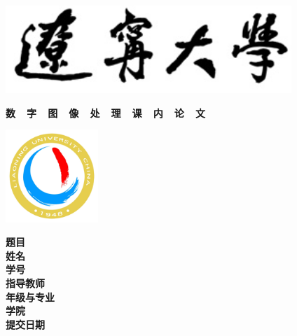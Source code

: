 {
  \setlength{\parindent}{0em}

  {
    \linespread{1}

    \vspace*{-1em}

    \begin{center}
      \includegraphics[width=108mm]{data/cover-zh/xiaoming}
    \end{center}

    \vspace{-1.5em}

    {
      \songti\erhao\bfseries
      \centering
      数~~字~~图~~像~~处~~理~~课~~内~~论~~文 \par
    }

    \vspace{1em}

    \begin{center}
      \includegraphics[width=35mm]{data/cover-zh/xiaobiao}
    \end{center}
  }

  \vspace{9em}

  {
    \linespread{1.6}
    \songti\sanhao\bfseries
    \centering
    \newlength{\titlelength}
    \setlength{\titlelength}{22em}
    题目 \; \underline{\makebox[\titlelength]{\zjutitlec}} \\
    姓名 \; \underline{\makebox[\titlelength]{\zjuauthornamec}} \\
    学号 \; \underline{\makebox[\titlelength]{\zjuauthorid}} \\
    指导教师 \; \underline{\makebox[\titlelength - 2em]{\zjumentorc}} \\
    年级与专业 \; \underline{\makebox[\titlelength - 3em]{\zjugrade \; \zjumajorc}} \\
    学院 \; \underline{\makebox[\titlelength]{\zjucollegec}} \\
    提交日期 \; \underline{\makebox[\titlelength - 2em]{\zjudatec}} \par
  }
}
